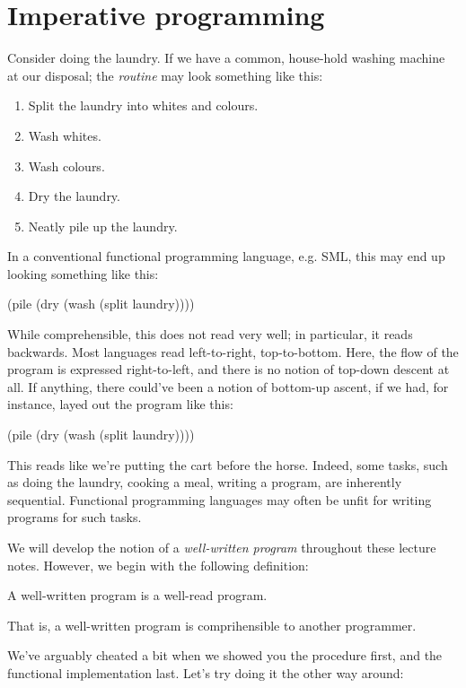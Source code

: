 \chapter{Imperative programming}

Consider doing the laundry. If we have a common, house-hold washing machine at
our disposal; the \emph{routine} may look something like this:

\begin{enumerate}

\item Split the laundry into whites and colours.

\item Wash whites.

\item Wash colours.

\item Dry the laundry.

\item Neatly pile up the laundry.

\end{enumerate}

In a conventional functional programming language, e.g. SML, this may end up
looking something like this:

\begin{code}
(pile (dry (wash (split laundry))))
\end{code}

While comprehensible, this does not read very well; in particular, it reads
backwards. Most  languages read
left-to-right, top-to-bottom. Here, the flow of the program is expressed
right-to-left, and there is no notion of top-down descent at all. If anything,
there could've been a notion of bottom-up ascent, if we had, for instance,
layed out the program like this:

\begin{code}
(pile
  (dry
    (wash
      (split laundry))))
\end{code}

This reads like we're putting the cart before the horse. Indeed, some tasks,
such as doing the laundry, cooking a meal, writing a program, are inherently
sequential. Functional programming languages may often be
 unfit for writing programs for
such tasks.

We will develop the notion of a \emph{well-written program} throughout these
lecture notes. However, we begin with the following definition:

\begin{definition}
A well-written program is a well-read program.
\end{definition}

That is, a well-written program is comprihensible to another programmer.


We've arguably cheated a bit when we showed you the procedure first, and the
functional implementation last. Let's try doing it the other way around:
